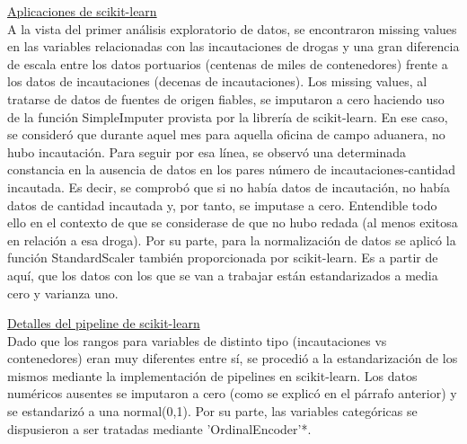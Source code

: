 \documentclass[12pt]{article}
\begin{document}
		
		\underline{Aplicaciones de scikit-learn}\\
		A la vista del primer análisis exploratorio de datos, se encontraron missing values en las variables relacionadas con las incautaciones de drogas y una gran diferencia de escala entre los datos portuarios (centenas de miles de contenedores) frente a los datos de incautaciones (decenas de incautaciones). Los missing values, al tratarse de datos de fuentes de origen fiables, se imputaron a cero haciendo uso de la función SimpleImputer provista por la librería de scikit-learn. En ese caso, se consideró que durante aquel mes para aquella oficina de campo aduanera, no hubo incautación. Para seguir por esa línea, se observó una determinada constancia en la ausencia de datos en los pares número de incautaciones-cantidad incautada. Es decir, se comprobó que si no había datos de incautación, no había datos de cantidad incautada y, por tanto, se imputase a cero. Entendible todo ello en el contexto de que se considerase de que no hubo redada (al menos exitosa en relación a esa droga). Por su parte, para la normalización de datos se aplicó la función StandardScaler también proporcionada por scikit-learn. Es a partir de aquí, que los datos con los que se van a trabajar están estandarizados a media cero y varianza uno.
		
		\underline{Detalles del pipeline de scikit-learn}\\
		Dado que los rangos para variables de distinto tipo (incautaciones vs contenedores) eran muy diferentes entre sí, se procedió a la estandarización de los mismos mediante la implementación de pipelines en scikit-learn. Los datos numéricos ausentes se imputaron a cero (como se explicó en el párrafo anterior) y se estandarizó a una normal(0,1). Por su parte, las variables categóricas se dispusieron a ser tratadas mediante 'OrdinalEncoder'*.
		
\end{document}
